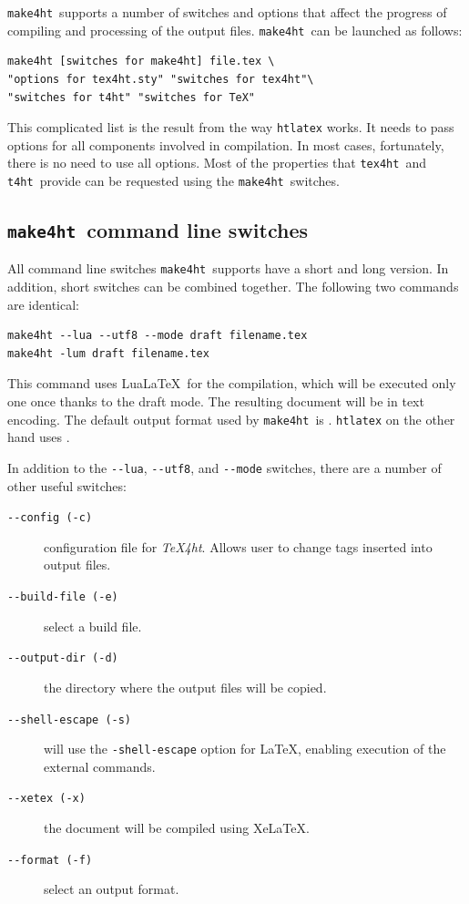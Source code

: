 \documentclass{ltugproc}
\newcommand\term[1]{\textit{#1}}
\newcommand\command[1]{\texttt{#1}}
\newcommand\texfourht{\term{\TeX\-4ht}}
\newcommand\texfourhtcmd{\command{tex4ht}}
\newcommand\tfourhtcmd{\command{t4ht}}
\newcommand\makefourht{\command{make4ht}}
\newcommand\switch[1]{\texttt{-\/-#1}}
\begin{document}
\makefourht\ supports a number of switches and options that affect the progress of compiling and processing of the output files.
\makefourht\ can be launched as follows:

\bgroup\small
\begin{verbatim}
make4ht [switches for make4ht] file.tex \
"options for tex4ht.sty" "switches for tex4ht"\
"switches for t4ht" "switches for TeX" 
\end{verbatim}
\egroup


This complicated list is the result  from  the way \command{htlatex} works.
It needs to  pass options for all components involved in
compilation. In most cases, fortunately, there is no need to use all options.
Most of the properties that \texfourhtcmd\ and \tfourhtcmd\ provide can be requested using the
\makefourht\ switches.

\subsection{\makefourht\ command line switches}

All command line switches \makefourht\ supports have a short and long version. In
addition, short switches can be combined together. The following two commands
are identical:


\bgroup\small
\begin{verbatim}
make4ht --lua --utf8 --mode draft filename.tex
make4ht -lum draft filename.tex
\end{verbatim}
\egroup

This command uses Lua\LaTeX\ for the compilation, which will be executed only one
once thanks to the draft mode. The resulting document will be in 
text encoding. The default output format used by \makefourht\ is \HTML5. \command{htlatex} on the other hand uses .

In addition to the \switch{lua}, \switch{utf8}, and \switch{mode} switches, there are a number of other useful switches:


\begin{description}
  \item[\switch{config (-c)}] configuration file for \texfourht. Allows user to change tags inserted into output files.
  \item[\switch{build-file (-e)}] select a build file.
  \item[\switch{output-dir (-d)}] the directory where the output files will be copied.
  \item[\switch{shell-escape (-s)}] will use the \texttt{-shell-\/escape} option for \LaTeX, enabling execution of the external commands.
  \item[\switch{xetex (-x)}] the document will be compiled using Xe\LaTeX.
  \item[\switch{format (-f)}] select an output format.
\end{description}
\end{document}
